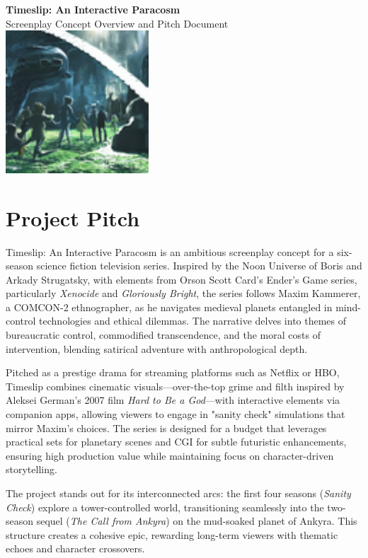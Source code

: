 \documentclass[10pt,letterpaper]{article}
\begin{document}
\begin{center}
{\Huge \textbf{Timeslip: An Interactive Paracosm}} \\
\vspace{0.2cm}
{\large Screenplay Concept Overview and Pitch Document} \\
\vspace{0.3cm}
\includegraphics[width=0.4\textwidth]{title_image.jpg} %
{}
\end{center}

\section{Project Pitch}
Timeslip: An Interactive Paracosm is an ambitious screenplay concept for a six-season science fiction television series. Inspired by the Noon Universe of Boris and Arkady Strugatsky, with elements from Orson Scott Card's Ender's Game series, particularly \textit{Xenocide} and \textit{Gloriously Bright}, the series follows Maxim Kammerer, a COMCON-2 ethnographer, as he navigates medieval planets entangled in mind-control technologies and ethical dilemmas. The narrative delves into themes of bureaucratic control, commodified transcendence, and the moral costs of intervention, blending satirical adventure with anthropological depth.

Pitched as a prestige drama for streaming platforms such as Netflix or HBO, Timeslip combines cinematic visuals—over-the-top grime and filth inspired by Aleksei German's 2007 film \textit{Hard to Be a God}—with interactive elements via companion apps, allowing viewers to engage in "sanity check" simulations that mirror Maxim's choices. The series is designed for a budget that leverages practical sets for planetary scenes and CGI for subtle futuristic enhancements, ensuring high production value while maintaining focus on character-driven storytelling.

The project stands out for its interconnected arcs: the first four seasons (\textit{Sanity Check}) explore a tower-controlled world, transitioning seamlessly into the two-season sequel (\textit{The Call from Ankyra}) on the mud-soaked planet of Ankyra. This structure creates a cohesive epic, rewarding long-term viewers with thematic echoes and character crossovers.
\end{document}

